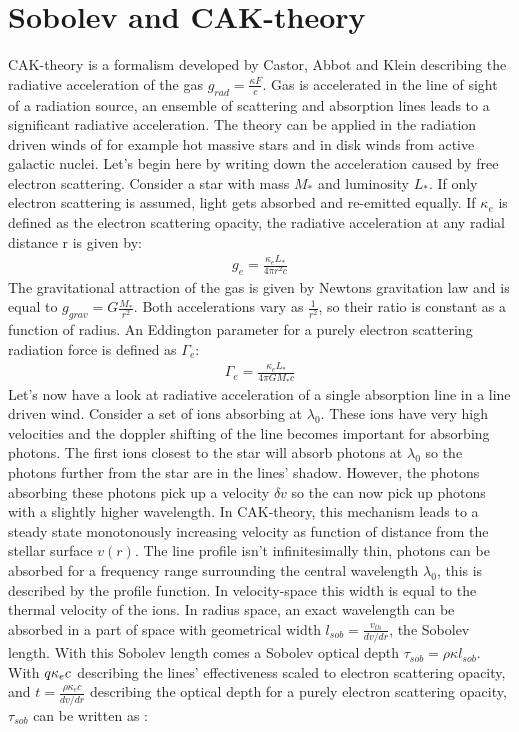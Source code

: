 \section{Sobolev and CAK-theory} \label{section: introduction CAK}
CAK-theory is a formalism developed by Castor, Abbot and Klein \citep{CAK1975} describing the radiative acceleration of the gas $g_{rad} = \frac{\kappa F}{c}$. Gas is accelerated in the line of sight of a radiation source, an ensemble of scattering and absorption lines leads to a significant radiative acceleration. The theory can be applied in the radiation driven winds of for example hot massive stars and in disk winds from active galactic nuclei. Let's begin here by writing down the acceleration caused by free electron scattering. Consider a star with mass $M_*$ and luminosity $L_*$. If only electron scattering is assumed, light gets absorbed and re-emitted equally. If $\kappa_e$ is defined as the electron scattering opacity, the radiative acceleration at any radial distance r is given by:
\begin{align}
g_e = \frac{\kappa_e L_*}{4 \pi r^2 c}
\end{align}
The gravitational attraction of the gas is given by Newtons gravitation law and is equal to $g_{grav} = G\frac{M_*}{r^2}$. Both accelerations vary as $\frac{1}{r^2}$, so their ratio is constant as a function of radius. An Eddington parameter for a purely electron scattering radiation force is defined as $\Gamma_e$:
\begin{align}
\Gamma_e = \frac{\kappa_e L_*}{4 \pi G M_* c}
\end{align}
Let's now have a look at radiative acceleration of a single absorption line in a line driven wind. Consider a set of ions absorbing at $\lambda_0$. These ions have very high velocities and the doppler shifting of the line becomes important for absorbing photons. The first ions closest to the star will absorb photons at $\lambda_0$ so the photons further from the star are in the lines' shadow. However, the photons absorbing these photons pick up a velocity $\delta v$ so the can now pick up photons with a slightly higher wavelength. In CAK-theory, this mechanism leads to a steady state monotonously increasing velocity as function of distance from the stellar surface $v(r)$. The line profile isn't infinitesimally thin, photons can be absorbed for a frequency range surrounding the central wavelength $\lambda_0$, this is described by the profile function. In velocity-space this width is equal to the thermal velocity of the ions. In radius space, an exact wavelength can be absorbed in a part of space with geometrical width $l_{sob} = \frac{v_{th}}{dv/dr}$, the Sobolev length. With this Sobolev length comes a Sobolev optical depth $\tau_{sob} = \rho \kappa l_{sob}$. With $q \def \frac{\kappa v_{th}}{\kappa_e c}$ describing the lines' effectiveness scaled to electron scattering opacity, and $t = \frac{\rho \kappa_e c}{dv/dr}$ describing the optical depth for a purely electron scattering opacity, $\tau_{sob}$ can be written as \citep{Owocki2003}:

